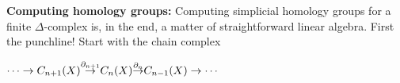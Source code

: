 \def\ccy{\Cyan}		  %
\def\cpb{\ProcessBlue}	  %
\def\csb{\SkyBlue}	  %
\def\ctu{\Turquoise}	  %
\def\ctb{\TealBlue}	  %
\def\caq{\Aquamarine}	  %
\def\cbg{\BlueGreen}	  %
\def\cem{\Emerald}	  %
\def\csg{\SeaGreen}	  %
\def\cgg{\Green}	  %
\def\cfg{\ForestGreen}	  %
\def\cpg{\PineGreen}	  %
\def\clg{\LimeGreen}	  %
\def\cyg{\YellowGreen}	  %
\def\cspg{\SpringGreen}	  %
\def\cog{\OliveGreen}	  %
\def\pars{\RawSienna}	  %
\def\cse{\Sepia}		  %
\def\cbr{\Brown}		  %
\def\cta{\Tan}		  %
\def\cgr{\Gray}		  %
\def\cbl{\Black}		  %
\def\cwh{\White}		  %


\loadmsbm



\def\ctln{\centerline}
\def\u{\underbar}
\def\ssk{\smallskip}
\def\msk{\medskip}
\def\bsk{\bigskip}
\def\hsk{\hskip.1in}
\def\hhsk{\hskip.2in}
\def\dsl{\displaystyle}
\def\hskp{\hskip1.5in}

\def\lra{$\Leftrightarrow$ }
\def\ra{\rightarrow}
\def\mpto{\logmapsto}
\def\pu{\pi_1}
\def\mpu{$\pi_1$}
\def\sig{\Sigma}
\def\msig{$\Sigma$}
\def\ep{\epsilon}
\def\sset{\subseteq}
\def\del{\partial}
\def\inv{^{-1}}
\def\wtl{\widetilde}
\def\del{\partial}
\def\delp{\partial^\prime}
\def\delpp{\partial^{\prime\prime}}
\def\sgn{{\roman{sgn}}}
\def\wtih{\widetilde{H}}
\def\bbz{{\Bbb Z}}
\def\bbr{{\Bbb R}}

{\bf Computing homology groups:} Computing simplicial homology
groups for a finite $\Delta$-complex is, in the end, a matter of
straightforward linear algebra. First the punchline!
Start with the chain complex

\ssk

\ctln{
$\cdots\ra C_{n+1}(X){\buildrel{\del_{n+1}}\over\ra}C_n(X)
{\buildrel{\del_n}\over\ra}C_{n-1}(X)\ra\cdots$
}


